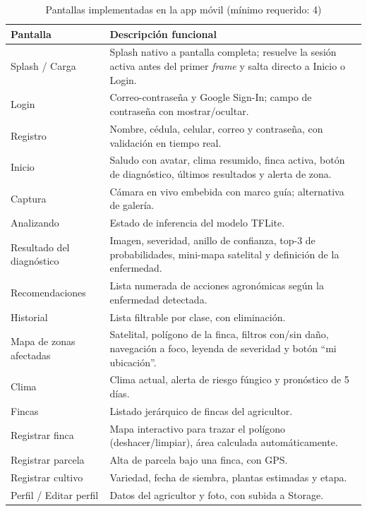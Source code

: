 \documentclass[12pt,a4paper]{article}
\begin{document}
\begin{table}[H]
\centering
\caption{Pantallas implementadas en la app móvil (mínimo requerido: 4)}
\label{tab:pantallas}
\renewcommand{\arraystretch}{1.3}
\small
\begin{tabular}{p{4.3cm} p{8.9cm}}
\toprule
\bfseries Pantalla & \bfseries Descripción funcional \\
\midrule
Splash / Carga & Splash nativo a pantalla completa; resuelve la sesión activa antes del primer \textit{frame} y salta directo a Inicio o Login. \\
Login & Correo-contraseña y Google Sign-In; campo de contraseña con mostrar/ocultar. \\
Registro & Nombre, cédula, celular, correo y contraseña, con validación en tiempo real. \\
Inicio & Saludo con avatar, clima resumido, finca activa, botón de diagnóstico, últimos resultados y alerta de zona. \\
Captura & Cámara en vivo embebida con marco guía; alternativa de galería. \\
Analizando & Estado de inferencia del modelo TFLite. \\
Resultado del diagnóstico & Imagen, severidad, anillo de confianza, top-3 de probabilidades, mini-mapa satelital y definición de la enfermedad. \\
Recomendaciones & Lista numerada de acciones agronómicas según la enfermedad detectada. \\
Historial & Lista filtrable por clase, con eliminación. \\
Mapa de zonas afectadas & Satelital, polígono de la finca, filtros con/sin daño, navegación a foco, leyenda de severidad y botón ``mi ubicación''. \\
Clima & Clima actual, alerta de riesgo fúngico y pronóstico de 5 días. \\
Fincas & Listado jerárquico de fincas del agricultor. \\
Registrar finca & Mapa interactivo para trazar el polígono (deshacer/limpiar), área calculada automáticamente. \\
Registrar parcela & Alta de parcela bajo una finca, con GPS. \\
Registrar cultivo & Variedad, fecha de siembra, plantas estimadas y etapa. \\
Perfil / Editar perfil & Datos del agricultor y foto, con subida a Storage. \\
\bottomrule
\end{tabular}
\end{table}
\end{document}
